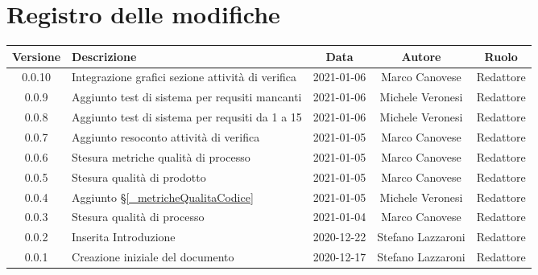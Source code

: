 \section*{Registro delle modifiche}

\begin{center}
	\begin{longtable}{|c|p{5cm}|c|c|c|}
	\hline
	\rowcolor{lighter-grayer}
	\textbf{Versione} & \textbf{Descrizione} & \textbf{Data} & \textbf{Autore} & \textbf{Ruolo} \\
	\hline
	\endfirsthead


	\hline
	0.0.10& Integrazione grafici sezione attività di verifica & 2021-01-06 & Marco Canovese & Redattore \\
	0.0.9 & Aggiunto test di sistema per requsiti mancanti& 2021-01-06 & Michele Veronesi & Redattore \\
	0.0.8 & Aggiunto test di sistema per requsiti da 1 a 15 & 2021-01-06 & Michele Veronesi & Redattore \\
	0.0.7 & Aggiunto resoconto attività di verifica & 2021-01-05 & Marco Canovese & Redattore \\
	0.0.6 & Stesura metriche qualità di processo & 2021-01-05 & Marco Canovese & Redattore \\
	0.0.5 & Stesura qualità di prodotto & 2021-01-05 & Marco Canovese & Redattore \\
	0.0.4 & Aggiunto \S\ref{_metricheQualitaCodice} & 2021-01-05 & Michele Veronesi & Redattore \\
	0.0.3 & Stesura qualità di processo & 2021-01-04 & Marco Canovese & Redattore \\
	0.0.2 & Inserita Introduzione & 2020-12-22 & Stefano Lazzaroni & Redattore\\
    0.0.1 & Creazione iniziale del documento & 2020-12-17 & Stefano Lazzaroni & Redattore\\
	\hline

	\end{longtable}
\end{center}
